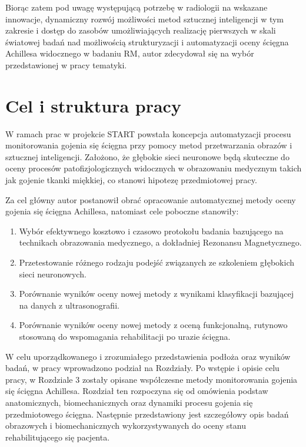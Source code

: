 Biorąc zatem pod uwagę występującą potrzebę w radiologii na wskazane innowacje, dynamiczny rozwój możliwości metod sztucznej inteligencji w tym zakresie i dostęp do zasobów umożliwiających realizację pierwszych w skali światowej badań nad możliwością strukturyzacji i automatyzacji oceny ścięgna Achillesa widocznego w badaniu RM, autor zdecydował się na wybór przedstawionej w pracy tematyki.  
 

{\let\clearpage\relax\chapter*{Cel i struktura pracy}}

W ramach prac w projekcie START powstała koncepcja automatyzacji procesu monitorowania gojenia się ścięgna przy pomocy metod przetwarzania obrazów i sztucznej inteligencji. Założono, że głębokie sieci neuronowe będą skuteczne do oceny procesów patofizjologicznych widocznych w obrazowaniu medycznym takich jak gojenie tkanki miękkiej, co stanowi hipotezę przedmiotowej pracy.

Za cel główny autor postanowił obrać opracowanie automatycznej metody oceny gojenia się ścięgna Achillesa, natomiast cele poboczne stanowiły:
\begin{enumerate}
	\item Wybór efektywnego kosztowo i czasowo protokołu badania bazującego na technikach obrazowania medycznego, a dokładniej Rezonansu Magnetycznego.
	\item Przetestowanie różnego rodzaju podejść związanych ze szkoleniem głębokich sieci neuronowych.
	\item Porównanie wyników oceny nowej metody z wynikami klasyfikacji bazującej na danych z ultrasonografii.
	\item Porównanie wyników oceny nowej metody z oceną funkcjonalną, rutynowo stosowaną do wspomagania rehabilitacji po urazie ścięgna.
\end{enumerate}

W celu uporządkowanego i zrozumiałego przedstawienia podłoża oraz wyników badań, w pracy wprowadzono podział na Rozdziały. Po wstępie i opisie celu pracy, w Rozdziale 3 zostały opisane współczesne metody monitorowania gojenia się ścięgna Achillesa. Rozdział ten rozpoczyna się od omówienia podstaw anatomicznych, biomechanicznych oraz dynamiki procesu gojenia się przedmiotowego ścięgna. Następnie przedstawiony jest szczegółowy opis badań obrazowych i biomechanicznych wykorzystywanych do oceny stanu rehabilitującego się pacjenta. 

